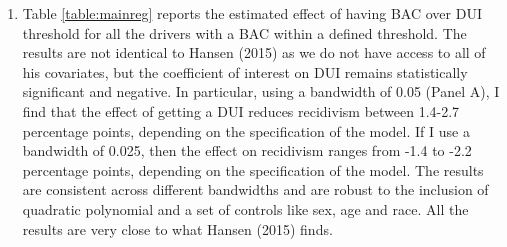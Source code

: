 \documentclass[11pt]{article}\usepackage[]{graphicx}\usepackage[]{color}
\begin{document}
\begin{enumerate}
 \item Table \ref{table:mainreg} reports the estimated effect of having BAC over DUI threshold for all the drivers with a BAC within a defined threshold. The results are not identical to Hansen (2015) as we do not have access to all of his covariates, but the coefficient of interest on DUI remains statistically significant and negative. In particular, using a  bandwidth of 0.05 (Panel A), I find that the effect of getting a DUI reduces recidivism between 1.4-2.7 percentage points, depending on the specification of the model. If I use a bandwidth of 0.025, then the effect on recidivism ranges from -1.4 to -2.2 percentage points, depending on the specification of the model. The results are consistent across different bandwidths and are robust to the inclusion of quadratic polynomial and a set of controls like sex, age and race. All the results are very close to what Hansen (2015) finds.
 


\end{enumerate}
\end{document}
